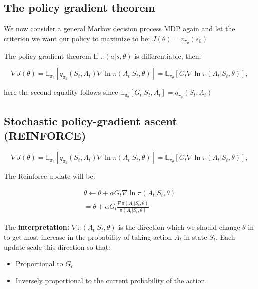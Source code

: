 \subsection*{The policy gradient theorem}
We now consider a general Markov decision process MDP again and let the criterion we want our policy to maximize to be: $J(\theta) = v_{\pi_\theta} (s_0)$

\begin{wbox}{The policy gradient theorem}
If $\pi (a|s, \theta)$ is differentiable, then:

	\begin{equation}
		\nabla J(\theta) = \mathbb{E}_{\pi_\theta} [q_{\pi_\theta}(S_t,A_t)\nabla \ln \pi (A_t|S_t, \theta)] = \mathbb{E}_{\pi_\theta} [G_t \nabla \ln \pi (A_t|S_t, \theta)],
	\end{equation}

here the second equality follows since $\mathbb{E}_{\pi_\theta} [G_t |S_t,A_t] = q_{\pi_\theta}(S_t,A_t)$
\end{wbox}


\subsection*{Stochastic policy-gradient ascent (REINFORCE)}
	\begin{equation}
		\nabla J(\theta) = \mathbb{E}_{\pi_\theta} [q_{\pi_\theta}(S_t,A_t)\nabla \ln \pi (A_t|S_t, \theta)] = \mathbb{E}_{\pi_\theta} [G_t \nabla \ln \pi (A_t|S_t, \theta)],
	\end{equation}

The Reinforce update will be:

	\begin{equation}
	\begin{aligned}
		\theta \leftarrow \theta + \alpha G_t \nabla \ln \pi (A_t|S_t, \theta) \\
		= \theta + \alpha G_t \frac{\nabla \pi (A_t|S_t, \theta)} {\pi (A_t|S_t, \theta) } 
	\end{aligned}
	\end{equation}

The \textbf{interpretation:} $\nabla \pi (A_t|S_t, \theta)$ is the direction which we should change $\theta$ in to get most increase in the probability of taking action $A_t$ in state $S_t$. Each update scale this direction so that:

	\begin{itemize}
		\item Proportional to $G_t$
		\item Inversely proportional to the current probability of the action.
	\end{itemize}


